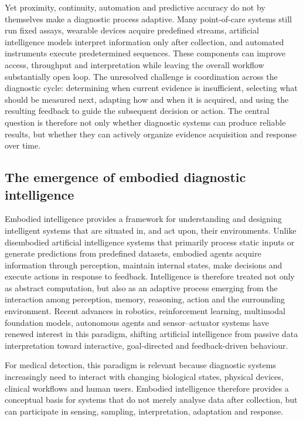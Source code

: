 \documentclass[12pt,a4paper]{article}
\begin{document}
Yet proximity, continuity, automation and predictive accuracy do not by themselves make a diagnostic process adaptive. Many point-of-care systems still run fixed assays, wearable devices acquire predefined streams, artificial intelligence models interpret information only after collection, and automated instruments execute predetermined sequences. These components can improve access, throughput and interpretation while leaving the overall workflow substantially open loop. The unresolved challenge is coordination across the diagnostic cycle: determining when current evidence is insufficient, selecting what should be measured next, adapting how and when it is acquired, and using the resulting feedback to guide the subsequent decision or action. The central question is therefore not only whether diagnostic systems can produce reliable results, but whether they can actively organize evidence acquisition and response over time.


\subsection{The emergence of embodied diagnostic intelligence}
\label{subsec:emergence_embodied_medical_detection_intelligence}

Embodied intelligence provides a framework for understanding and designing intelligent systems that are situated in, and act upon, their environments. Unlike disembodied artificial intelligence systems that primarily process static inputs or generate predictions from predefined datasets, embodied agents acquire information through perception, maintain internal states, make decisions and execute actions in response to feedback. Intelligence is therefore treated not only as abstract computation, but also as an adaptive process emerging from the interaction among perception, memory, reasoning, action and the surrounding environment. Recent advances in robotics, reinforcement learning, multimodal foundation models, autonomous agents and sensor--actuator systems have renewed interest in this paradigm, shifting artificial intelligence from passive data interpretation toward interactive, goal-directed and feedback-driven behaviour.

For medical detection, this paradigm is relevant because diagnostic systems increasingly need to interact with changing biological states, physical devices, clinical workflows and human users. Embodied intelligence therefore provides a conceptual basis for systems that do not merely analyse data after collection, but can participate in sensing, sampling, interpretation, adaptation and response.
\end{document}
